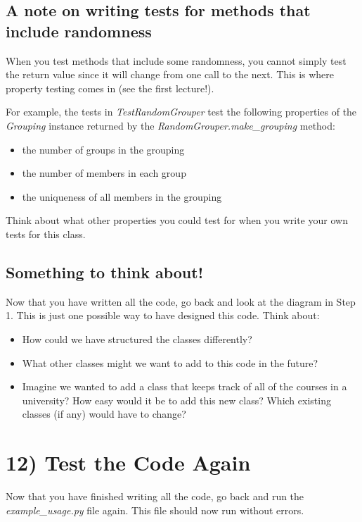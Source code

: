 \documentclass[12pt]{article}
\begin{document}
\subsection*{A note on writing tests for methods that include randomness}
When you test methods that include some randomness, you cannot simply test the
return value since it will change from one call to the next. This is where property
testing comes in (see the first lecture!).

\bigskip

For example, the tests in \textit{TestRandomGrouper} test the following properties
of the \textit{Grouping} instance returned by the \textit{RandomGrouper.make\_grouping} method:

\begin{itemize}
    \item the number of groups in the grouping
    \item the number of members in each group
    \item the uniqueness of all members in the grouping
\end{itemize}

\bigskip

\noindent Think about what other properties you could test for when you write your own tests
for this class.

\bigskip

\subsection*{Something to think about!}
Now that you have written all the code, go back and look at the diagram in Step 1.
This is just one possible way to have designed this code. Think about:

\bigskip

\begin{itemize}
\item How could we have structured the classes differently?
\item What other classes might we want to add to this code in the future?
\item Imagine we wanted to add a class that keeps track of all of the courses in
a university? How easy would it be to add this new class? Which existing classes
(if any) would have to change?
\end{itemize}

\section*{12) Test the Code Again}
Now that you have finished writing all the code, go back and run the
\textit{example\_usage.py} file again. This file should now run without errors.
\end{document}
